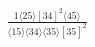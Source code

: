 \documentclass[varwidth, border=5pt]{standalone}
\begin{document}
\begin{my}
$\begin{gathered}
\scriptscriptstyle\frac{1⟨25⟩[34]^2⟨45⟩}{⟨15⟩⟨34⟩⟨35⟩[35]^2}
\end{gathered}$
\end{my}
\end{document}
